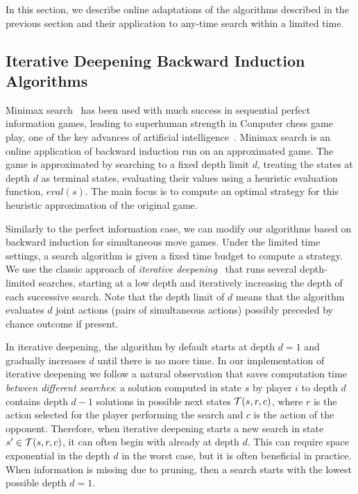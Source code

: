 
In this section, we describe online adaptations of the algorithms described in the previous section and their application
to any-time search within a limited time.

\subsection{Iterative Deepening Backward Induction Algorithms} \label{sec:idbi}

Minimax search~\cite{AIbook} has been used with much success in sequential perfect information games,
leading to superhuman strength in Computer chess game play, one of the key advances of artificial
intelligence~\cite{Campbell02deepblue}.
Minimax search is an online application of backward induction run on an approximated game.
The game is approximated by searching to a fixed depth limit $d$, treating the states at depth $d$
as terminal states, evaluating their values using a heuristic evaluation function, $eval(s)$.
The main focus is to compute an optimal strategy for this heuristic approximation of the original game.

Similarly to the perfect information case, we can modify our algorithms based on backward induction for simultaneous move games.
Under the limited time settings, a search algorithm is given a fixed time budget to compute a strategy.
We use the classic approach of {\it iterative deepening}~\cite{AIbook} that runs several depth-limited
searches, starting at a low depth and iteratively increasing the depth of each successive search.
Note that the depth limit of $d$ means that the algorithm evaluates $d$ joint actions (\ie pairs of simultaneous actions) possibly preceded by chance outcome if present.

In iterative deepening, the algorithm by default starts at depth $d = 1$ and gradually increases $d$ until there is no more time.
In our implementation of iterative deepening we follow a natural observation that saves computation time {\it between different searches}: 
a solution computed in state $s$ by player $i$ to depth $d$ contains depth $d-1$ solutions in possible next states $\mathcal{T}(s,r,c)$, where $r$ is the action selected for the player performing the search and $c$ is the action of the opponent.
Therefore, when iterative deepening starts a new search in state $s' \in \mathcal{T}(s,r,c)$, it can often begin with already at depth $d$.
This can require space exponential in the depth $d$ in the worst case, but it is often beneficial in practice.
When information is missing due to pruning, then a search starts with the lowest possible depth $d = 1$.


